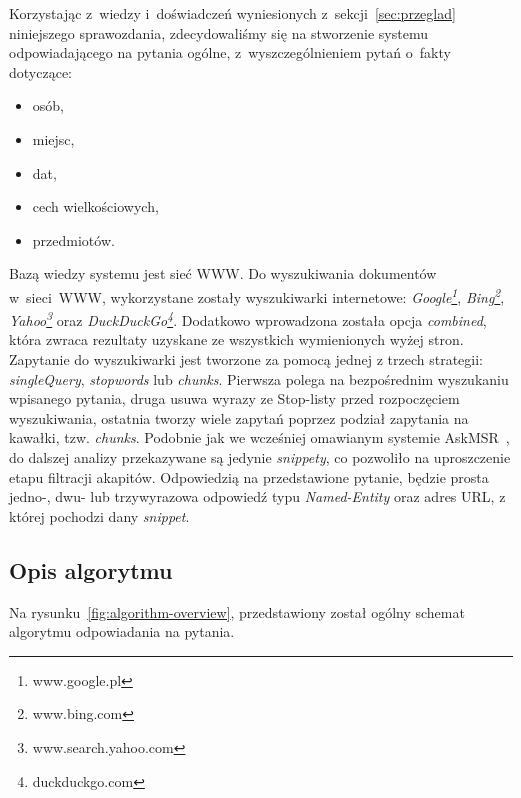 Korzystając z~wiedzy i~doświadczeń wyniesionych z~sekcji~\ref{sec:przeglad} niniejszego sprawozdania, zdecydowaliśmy się na stworzenie systemu odpowiadającego na pytania ogólne, z~wyszczególnieniem pytań o~fakty dotyczące:
\begin{itemize}
	\item osób,
	\item miejsc,
	\item dat,
	\item cech wielkościowych,
	\item przedmiotów.
\end{itemize}

Bazą wiedzy systemu jest sieć WWW. Do wyszukiwania dokumentów w~sieci~WWW, wykorzystane zostały wyszukiwarki internetowe: \emph{Google\footnote{www.google.pl}}, \emph{Bing\footnote{www.bing.com}}, \emph{Yahoo\footnote{www.search.yahoo.com}} oraz \emph{DuckDuckGo\footnote{duckduckgo.com}}. Dodatkowo wprowadzona została opcja \emph{combined}, która zwraca rezultaty uzyskane ze wszystkich wymienionych wyżej stron. Zapytanie do wyszukiwarki jest tworzone za pomocą jednej z trzech strategii: \emph{singleQuery}, \emph{stopwords} lub \emph{chunks}. Pierwsza polega na bezpośrednim wyszukaniu wpisanego pytania, druga usuwa wyrazy ze Stop-listy przed rozpoczęciem wyszukiwania, ostatnia tworzy wiele zapytań poprzez podział zapytania na kawałki, tzw. \emph{chunks}. Podobnie jak we wcześniej omawianym systemie AskMSR~\cite{brill2002analysis}, do dalszej analizy przekazywane są jedynie \emph{snippety}, co pozwoliło na uproszczenie etapu filtracji akapitów. 
Odpowiedzią na przedstawione pytanie, będzie prosta jedno-, dwu- lub trzywyrazowa odpowiedź typu \emph{Named-Entity} oraz adres URL, z której pochodzi dany \emph{snippet}. 


\subsection{Opis algorytmu}
Na rysunku~\ref{fig:algorithm-overview}, przedstawiony został ogólny schemat algorytmu odpowiadania na pytania.

